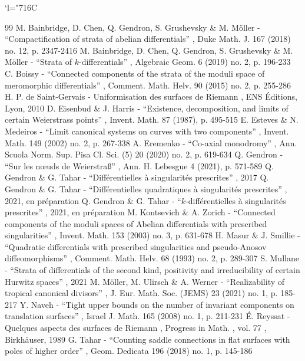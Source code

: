 \documentclass[11pt]{article}
\numberwithin{equation}{section}\renewcommand{\proofname}{Démonstration}
\newcommand{\Changelback}{\mathcode`l="716C}
\theoremstyle{definition}
\begin{document}
\Changelback


\begin{thebibliography}{99}
 M. Bainbridge, D. Chen, Q. Gendron, S. Grushevsky \& M. Möller - “Compactification of strata of abelian differentials” , Duke Math. J. 167 (2018) no. 12, p. 2347-2416
 M. Bainbridge, D. Chen, Q. Gendron, S. Grushevsky \& M. Möller - “Strata of $k$-differentials” , Algebraic Geom. 6 (2019) no. 2, p. 196-233
 C. Boissy - “Connected components of the strata of the moduli space of meromorphic differentials” , Comment. Math. Helv. 90 (2015) no. 2, p. 255-286
 H. P. de Saint-Gervais - Uniformisation des surfaces de Riemann , ENS Éditions, Lyon, 2010
 D. Eisenbud \& J. Harris - “Existence, decomposition, and limits of certain Weierstrass points” , Invent. Math. 87 (1987), p. 495-515
 E. Esteves \& N. Medeiros - “Limit canonical systems on curves with two components” , Invent. Math. 149 (2002) no. 2, p. 267-338
 A. Eremenko - “Co-axial monodromy” , Ann. Scuola Norm. Sup. Pisa Cl. Sci. (5) 20 (2020) no. 2, p. 619-634
 Q. Gendron - “Sur les nœuds de Weierstraß” , Ann. H. Lebesgue 4 (2021), p. 571-589
 Q. Gendron \& G. Tahar - “Différentielles à singularités prescrites” , 2017
 Q. Gendron \& G. Tahar - “Différentielles quadratiques à singularités prescrites” , 2021, en préparation
 Q. Gendron \& G. Tahar - “$k$-différentielles à singularités prescrites” , 2021, en préparation
 M. Kontsevich \& A. Zorich - “Connected components of the moduli spaces of Abelian differentials with prescribed singularities” , Invent. Math. 153 (2003) no. 3, p. 631-678
 H. Masur \& J. Smillie - “Quadratic differentials with prescribed singularities and pseudo-Anosov diffeomorphisms” , Comment. Math. Helv. 68 (1993) no. 2, p. 289-307
 S. Mullane - “Strata of differentials of the second kind, positivity and irreducibility of certain Hurwitz spaces” , 2021
 M. Möller, M. Ulirsch \& A. Werner - “Realizability of tropical canonical divisors” , J. Eur. Math. Soc. (JEMS) 23 (2021) no. 1, p. 185-217
 Y. Naveh - “Tight upper bounds on the number of invariant components on translation surfaces” , Israel J. Math. 165 (2008) no. 1, p. 211-231
 É. Reyssat - Quelques aspects des surfaces de Riemann , Progress in Math. , vol. 77 , Birkhäuser, 1989
 G. Tahar - “Counting saddle connections in flat surfaces with poles of higher order” , Geom. Dedicata 196 (2018) no. 1, p. 145-186
\end{thebibliography}
\end{document}

